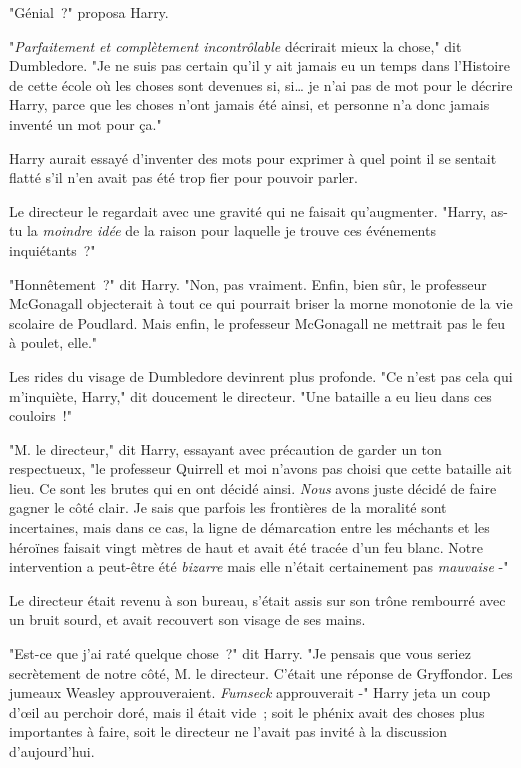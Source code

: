 "Génial~?" proposa Harry.

"\emph{Parfaitement et complètement incontrôlable} décrirait mieux la chose," dit Dumbledore. "Je ne suis pas certain qu'il y ait jamais eu un temps dans l'Histoire de cette école où les choses sont devenues si, si… je n'ai pas de mot pour le décrire Harry, parce que les choses n'ont jamais été ainsi, et personne n'a donc jamais inventé un mot pour ça."

Harry aurait essayé d'inventer des mots pour exprimer à quel point il se sentait flatté s'il n'en avait pas été trop fier pour pouvoir parler.

Le directeur le regardait avec une gravité qui ne faisait qu'augmenter. "Harry, as-tu la \emph{moindre idée} de la raison pour laquelle je trouve ces événements inquiétants~?"

"Honnêtement~?" dit Harry. "Non, pas vraiment. Enfin, bien sûr, le professeur McGonagall objecterait à tout ce qui pourrait briser la morne monotonie de la vie scolaire de Poudlard. Mais enfin, le professeur McGonagall ne mettrait pas le feu à poulet, elle."

Les rides du visage de Dumbledore devinrent plus profonde. "Ce n'est pas cela qui m'inquiète, Harry," dit doucement le directeur. "Une bataille a eu lieu dans ces couloirs~!"

"M. le directeur," dit Harry, essayant avec précaution de garder un ton respectueux, "le professeur Quirrell et moi n'avons pas choisi que cette bataille ait lieu. Ce sont les brutes qui en ont décidé ainsi. \emph{Nous} avons juste décidé de faire gagner le côté clair. Je sais que parfois les frontières de la moralité sont incertaines, mais dans ce cas, la ligne de démarcation entre les méchants et les héroïnes faisait vingt mètres de haut et avait été tracée d'un feu blanc. Notre intervention a peut-être été \emph{bizarre} mais elle n'était certainement pas \emph{mauvaise} -"

Le directeur était revenu à son bureau, s'était assis sur son trône rembourré avec un bruit sourd, et avait recouvert son visage de ses mains.

"Est-ce que j'ai raté quelque chose~?" dit Harry. "Je pensais que vous seriez secrètement de notre côté, M. le directeur. C'était une réponse de Gryffondor. Les jumeaux Weasley approuveraient. \emph{Fumseck} approuverait -" Harry jeta un coup d'œil au perchoir doré, mais il était vide~; soit le phénix avait des choses plus importantes à faire, soit le directeur ne l'avait pas invité à la discussion d'aujourd'hui.

